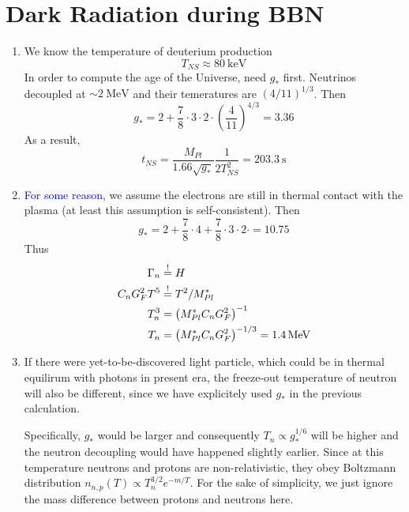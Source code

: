 \section{Dark Radiation during BBN}
\begin{enumerate}[label=\alph*)]
   \item We know the temperature of deuterium production 
      \begin{equation*}
         T_{NS} \approx \SI{80}{\kilo\eV}
      \end{equation*}
      In order to compute the age of the Universe, need $g_*$ first. Neutrinos decoupled at $\sim \SI{2}{\mega\eV}$ and their temeratures are $(4/11)^{1/3}$. Then
      \begin{equation}
         g_* = 2 + \frac{7}{8} \cdot 3 \cdot 2 \cdot \left( \frac{4}{11} \right)^{4/3} = 3.36
      \end{equation}
      As a result,
      \begin{equation}
         t_{NS} = \frac{M_{Pl}}{1.66\sqrt{g_*}} \frac{1}{2 T^2_{NS}} = \SI{203.3}{\s}
      \end{equation}
   \item \textcolor{blue}{For some reason}, we assume the electrons are still in thermal contact with the plasma (at least this assumption is self-consistent). Then 
      \begin{equation}
         g_* = 2 + \frac{7}{8} \cdot 4 + \frac{7}{8} \cdot 3 \cdot 2 \cdot = 10.75
      \end{equation}
      Thus
      \begin{align}
         \Gamma_n &\stackrel{!}{=} H \notag \\
         C_n G_F^2 T^5 &\stackrel{!}{=} T^2 / M_{Pl}^* \notag \\
         T_n^3 &= \left(M_{Pl}^* C_n G_F^2 \right)^{-1} \notag \\
         T_n &= \left(M_{Pl}^* C_n G_F^2 \right)^{-1/3} = \SI{1.4}{\mega\eV}
      \end{align}
   \item
      If there were yet-to-be-discovered light particle, which could be in thermal equilirum with photons in present era, the freeze-out temperature of neutron will also be different, since we have explicitely used $g_*$ in the previous calculation. 

      Specifically, $g_*$ would be larger and consequently $T_n \propto g_*^{1/6}$ will be higher and the neutron decoupling would have happened slightly earlier. Since at this temperature neutrons and protons are non-relativistic, they obey Boltzmann distribution $n_{n,p}(T) \propto T_n^{3/2} e^{-m/T}$. For the sake of simplicity, we just ignore the mass difference between protons and neutrons here.       


\end{enumerate}
